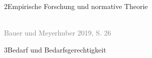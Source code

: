 \documentclass[xcolor=table,9pt,aspectratio=169]{beamer}
\begin{document}
\begin{frame}{\vspace*{10mm}2\hspace*{1em}Empirische Forschung und normative Theorie}
\begin{center}
   \\
   \footnotesize{\textcolor{gray}{Bauer und Meyerhuber 2019, S. 26}}
\end{center}
\end{frame}


\begin{frame}{\vspace*{10mm}3\hspace*{1em}Bedarf und Bedarfsgerechtigkeit}
\begin{center}
\end{center}
\end{frame}
\end{document}
